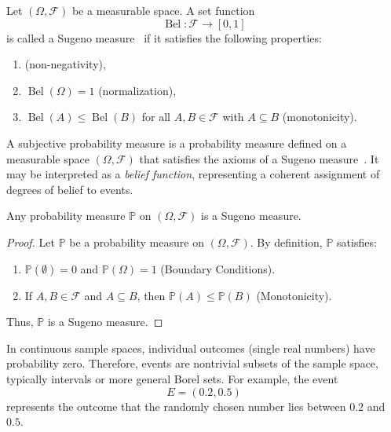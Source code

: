 \begin{definition}
	\label{def:sugeno_measure}
	Let $(\Omega, \mathcal{F})$ be a measurable space. 
	A set function
	\begin{equation}
		\operatorname{Bel}\colon \mathcal{F} \to [0,1]
	\end{equation}
	is called a Sugeno measure~\cite{shafer1987} if it satisfies the following properties:
	\begin{enumerate}
		\item {} (non-negativity),
		\item $\operatorname{Bel}(\Omega) = 1$ (normalization),
		\item $\operatorname{Bel}(A) \le \operatorname{Bel}(B)$ for all $A, B \in \mathcal{F}$ with $A \subseteq B$ (monotonicity).
	\end{enumerate}
\end{definition}

\begin{definition}
	\label{def:subjective_probability}
	A subjective probability measure is a probability measure defined on a measurable space $(\Omega, \mathcal{F})$ that satisfies the axioms of a Sugeno measure~\cite{shafer1987,hoff2009first}. It may be interpreted as a \emph{belief function}, representing a coherent assignment of degrees of belief to events.
\end{definition}

\newpage
\begin{theorem}
	Any probability measure $\mathbb{P}$ on $(\Omega, \mathcal{F})$ is a Sugeno measure.
\end{theorem}
\begin{proof}
	Let $\mathbb{P}$ be a probability measure on $(\Omega, \mathcal{F})$. By definition, $\mathbb{P}$ satisfies:
	\begin{enumerate}
		\item $\mathbb{P}(\emptyset) = 0$ and $\mathbb{P}(\Omega) = 1$ (Boundary Conditions).
		\item If $A, B \in \mathcal{F}$ and $A \subseteq B$, then $\mathbb{P}(A) \leq \mathbb{P}(B)$ (Monotonicity).
	\end{enumerate}
	Thus, $\mathbb{P}$ is a Sugeno measure.
\end{proof}


\begin{remark}
	In continuous sample spaces, individual outcomes (single real numbers) have probability zero. Therefore, events are nontrivial subsets of the sample space, typically intervals or more general Borel sets. For example, the event 
	\begin{equation}
		E = (0.2, 0.5)
	\end{equation} 
	represents the outcome that the randomly chosen number lies between $0.2$ and $0.5$.
\end{remark}

